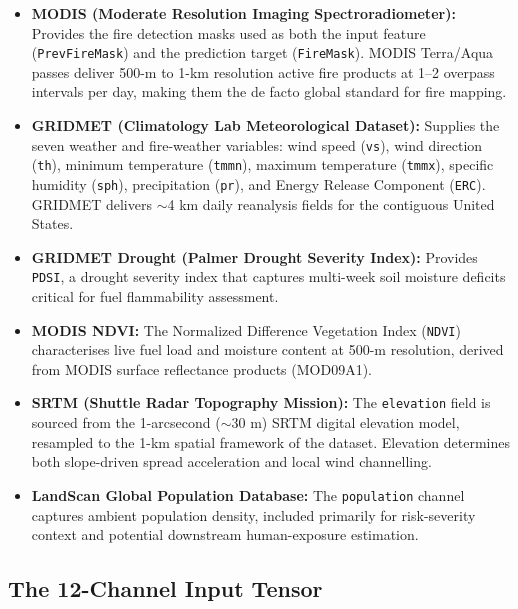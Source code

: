 \begin{itemize}
    \item \textbf{MODIS (Moderate Resolution Imaging Spectroradiometer):} Provides the fire detection masks used as both the input feature (\texttt{PrevFireMask}) and the prediction target (\texttt{FireMask}).
          MODIS Terra/Aqua passes deliver 500-m to 1-km resolution active fire products at 1–2 overpass intervals per day, making them the de facto global standard for fire mapping.

    \item \textbf{GRIDMET (Climatology Lab Meteorological Dataset):} Supplies the seven weather and fire-weather variables: wind speed (\texttt{vs}), wind direction (\texttt{th}), minimum temperature (\texttt{tmmn}), maximum temperature (\texttt{tmmx}), specific humidity (\texttt{sph}), precipitation (\texttt{pr}), and Energy Release Component (\texttt{ERC}).
          GRIDMET delivers $\sim$4 km daily reanalysis fields for the contiguous United States.

    \item \textbf{GRIDMET Drought (Palmer Drought Severity Index):} Provides \texttt{PDSI}, a drought severity index that captures multi-week soil moisture deficits critical for fuel flammability assessment.

    \item \textbf{MODIS NDVI:} The Normalized Difference Vegetation Index (\texttt{NDVI}) characterises live fuel load and moisture content at 500-m resolution, derived from MODIS surface reflectance products (MOD09A1).

    \item \textbf{SRTM (Shuttle Radar Topography Mission):} The \texttt{elevation} field is sourced from the 1-arcsecond ($\sim$30 m) SRTM digital elevation model, resampled to the 1-km spatial framework of the dataset.
          Elevation determines both slope-driven spread acceleration and local wind channelling.

    \item \textbf{LandScan Global Population Database:} The \texttt{population} channel captures ambient population density, included primarily for risk-severity context and potential downstream human-exposure estimation.
\end{itemize}

\subsection{The 12-Channel Input Tensor}

